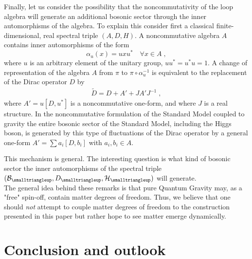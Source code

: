 \documentclass[12pt]{article}
\newcommand{\ba}{\begin{eqnarray}}
\newcommand{\ea}{\end{eqnarray}}
\def\a{\alpha}
\def\cb{{\cal B}}
\def\ch{{\cal H}}
\begin{document}
Finally, let us consider the possibility that the noncommutativity of the loop algebra will generate an additional bosonic sector
through the inner automorphisms of the algebra. To explain this consider first a classical finite-dimensional, real spectral triple $(A,D,H)$. 
A noncommutative algebra $A$ contains inner automorphisms of the form
\[
\a_u(x)= u x u^\ast\quad \forall x\in A \;,
\]
where $u$ is an arbitrary element of the unitary group, $uu^\ast=u^\ast u =1$. A change of representation of the algebra $A$ from
$\pi$ to  $\pi\circ \a_u^{-1}$ is equivalent to the replacement of the Dirac operator $D$ by
\ba 
\tilde{D}= D + A' + J A' J^{-1}\;,
\label{asdf}
\ea
where $A'= u[D,u^\ast]$ is a noncommutative one-form, and where $J$ is a real structure. In the noncommutative formulation of the Standard Model coupled to gravity \cite{Connes:1996gi} the entire bosonic sector of the Standard Model, including the Higgs boson, is generated by this type of fluctuations of the Dirac operator by a general one-form $A'=\sum a_i[D,b_i]$ with $a_i,b_i\in A$. 


This mechanism is general. The interesting question is what kind of bosonic sector the inner automorphisms of the spectral triple $(\cb_{\smalltriangleup},D_{\smalltriangleup},\ch_\smalltriangleup)$ will generate.  \\


The general idea behind these remarks is that pure Quantum Gravity may, as a "free" spin-off, contain matter degrees of freedom. Thus, we believe that one should {\it not} attempt to couple matter degrees of freedom to the construction
presented in this paper but rather hope to see matter emerge dynamically.





\section{Conclusion and outlook}
\label{section4}
\end{document}
